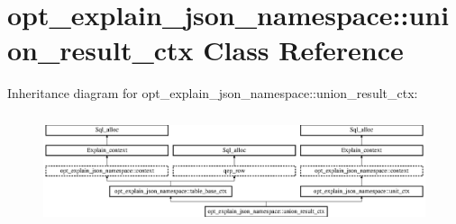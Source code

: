 \hypertarget{classopt__explain__json__namespace_1_1union__result__ctx}{}\section{opt\+\_\+explain\+\_\+json\+\_\+namespace\+:\+:union\+\_\+result\+\_\+ctx Class Reference}
\label{classopt__explain__json__namespace_1_1union__result__ctx}
Inheritance diagram for opt\+\_\+explain\+\_\+json\+\_\+namespace\+:\+:union\+\_\+result\+\_\+ctx\+:\begin{figure}[H]
\begin{center}
\leavevmode
\includegraphics[height=3.297998cm]{classopt__explain__json__namespace_1_1union__result__ctx}
\end{center}
\end{figure}
